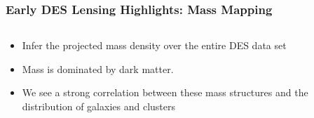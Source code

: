 \documentclass{beamer}
\begin{document}
\frame
{

    \frametitle{Early DES Lensing Highlights: Mass Mapping}

 
    \begin{columns}
        \begin{column}{0.4\textwidth}
            \begin{itemize}

                \item Infer the projected mass density
                    over the entire DES data set
                
                \item Mass is dominated by dark matter.

                \item We see a strong correlation between these mass structures
                    and the distribution of galaxies and clusters


\end{itemize}
\end{column}
\end{columns}}
\end{document}
